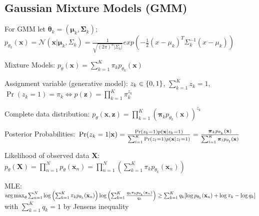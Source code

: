 \documentclass[a4paper, 11pt, landscape]{article}
\DeclareMathOperator*{\argmax}{arg\,max}
\begin{document}
\begin{multicols*}{3}
    \section{Gaussian Mixture Models (GMM)}
    For GMM let $\boldsymbol{\theta}_k = (\boldsymbol{\mu}_k, \boldsymbol{\Sigma}_k)$; $p_{\theta_k}(\mathbf{x}) = 
    \mathcal{N}(\mathbf{x} | \boldsymbol{\mu}_k, \Sigma_k) = \frac{1}{\sqrt{(2\pi)^n|\Sigma_k|}}exp(-\frac{1}{2}(x-\mu_k)^T\Sigma_k^{-1}(x-\mu_k))$
    \begin{compactdesc}
    \item[Mixture Models:] $p_\theta(\mathbf{x}) = \sum_{k=1}^K \pi_k p_{\theta_k}(\mathbf{x})$
    \item[Assignment variable (generative model):] $\\z_k \in \{0, 1\}$, $\sum_{k=1}^K z_k = 1$, $\operatorname{Pr}(z_k = 1) = \pi_k \Leftrightarrow p(\mathbf{z}) = \prod_{k=1}^K \pi_k^{z_k}$
    \item[Complete data distribution:] $p_\theta(\mathbf{x}, \mathbf{z}) = \prod_{k=1}^K \left( \boldsymbol{\pi}_k p_{\theta_k}(\mathbf{x})\right)^{z_k}$
    \item[Posterior Probabilities:] $\\\operatorname{Pr}(z_k = 1 | \mathbf{x}) = \frac{\operatorname{Pr}(z_k = 1) p(\mathbf{x} | z_k = 1)}{\sum_{l=1}^K \operatorname{Pr}(z_l = 1) p(\mathbf{x} | z_l = 1)} = \frac{\boldsymbol{\pi}_k p_{\theta_k}(\mathbf{x})}{\sum_{l=1}^K \boldsymbol{\pi}_l p_{\theta_l}(\mathbf{x})}$
    \item[Likelihood of observed data $\mathbf{X}$:] $p_\theta(\mathbf{X}) = \prod_{n=1}^N p_\theta(\mathbf{x}_n) = \prod_{n=1}^N \left(\sum_{k=1}^K \pi_k p_{\theta_k}(\mathbf{x}_n)\right)$
    \item[MLE:] $\argmax_\theta\sum_{n=1}^N \log \left( \sum_{k=1}^K \pi_k p_{\theta_k}(\mathbf{x}_n)\right) \break \log \left( \sum_{k=1}^K{\frac{q_k \pi_k p_{\theta_k}(\mathbf{x}_n)}{q_k}}\right) \ge \sum_{k=1}^K{q_k[\log p_{\theta_k}(\mathbf{x}_n) + \log \pi_k - \log q_k]}$ with $\sum_{k=1}^K{q_k} = 1$ by Jensens inequality
    \end{compactdesc}


\end{multicols*}
\end{document}
